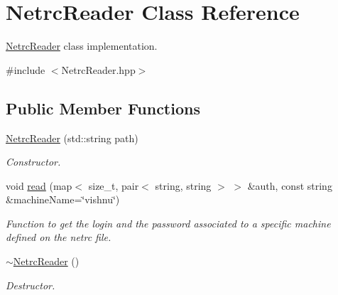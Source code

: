 \hypertarget{classNetrcReader}{
\section{NetrcReader Class Reference}
\label{classNetrcReader}
}


\hyperlink{classNetrcReader}{NetrcReader} class implementation.  




{\ttfamily \#include $<$NetrcReader.hpp$>$}

\subsection*{Public Member Functions}
\begin{DoxyCompactItemize}
\item 
\hyperlink{classNetrcReader_ab9005fa7effec542628d4dfb033f6969}{NetrcReader} (std::string path)
\begin{DoxyCompactList}\small\item\em Constructor. \item\end{DoxyCompactList}\item 
void \hyperlink{classNetrcReader_aaa144b4213f3e167308b8c770d4e49b4}{read} (map$<$ size\_\-t, pair$<$ string, string $>$ $>$ \&auth, const string \&machineName=\char`\"{}vishnu\char`\"{})
\begin{DoxyCompactList}\small\item\em Function to get the login and the password associated to a specific machine defined on the netrc file. \item\end{DoxyCompactList}\item 
\hypertarget{classNetrcReader_ac5efff041a69f24199e82ca89fce9494}{
\hyperlink{classNetrcReader_ac5efff041a69f24199e82ca89fce9494}{$\sim$NetrcReader} ()}
\label{classNetrcReader_ac5efff041a69f24199e82ca89fce9494}

\begin{DoxyCompactList}\small\item\em Destructor. \item\end{DoxyCompactList}\end{DoxyCompactItemize}
